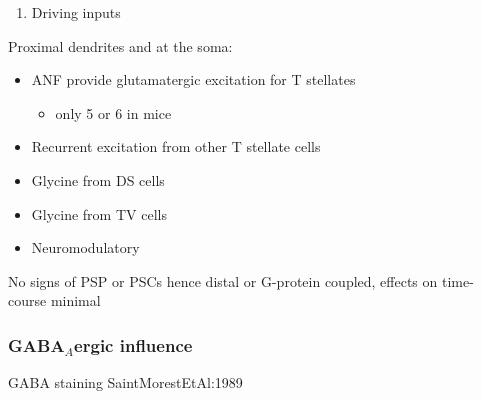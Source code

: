 \begin{enumerate}
\item Driving inputs
\end{enumerate}
Proximal dendrites and at the soma:

\begin{itemize}
\item ANF provide glutamatergic excitation for T stellates  \citep{Cant:1981,FerragamoGoldingEtAl:1998a,Alibardi:1998a}
\begin{itemize}
\item only 5 or 6 in mice \citep{FerragamoGoldingEtAl:1998a,CaoOertel:2010}
\end{itemize}
\item Recurrent excitation from other T stellate cells \citep{FerragamoGoldingEtAl:1998a}
\item Glycine from DS cells \citep{FerragamoGoldingEtAl:1998a}
\item Glycine from TV cells \citep{WickesbergOertel:1990,ZhangOertel:1993b}
\item Neuromodulatory
\end{itemize}
     No signs of PSP or PSCs hence distal or G-protein coupled, effects on time-course minimal

\subsubsection{GABA$_A$ergic influence}


GABA staining SaintMorestEtAl:1989


